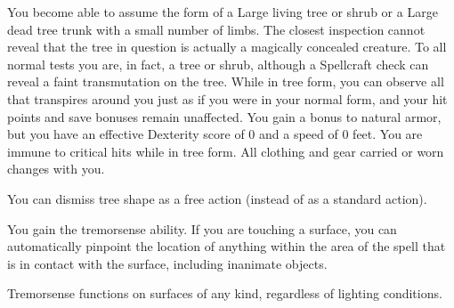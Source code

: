 \begin{spelleffect}
  You become able to assume the form of a Large living tree or shrub or a Large dead tree trunk with a small number of limbs. The closest inspection cannot reveal that the tree in question is actually a magically concealed creature. To all normal tests you are, in fact, a tree or shrub, although a Spellcraft check can reveal a faint transmutation on the tree. While in tree form, you can observe all that transpires around you just as if you were in your normal form, and your hit points and save bonuses remain unaffected. You gain a  bonus to natural armor, but you have an effective Dexterity score of 0 and a speed of 0 feet. You are immune to critical hits while in tree form. All clothing and gear carried or worn changes with you.
\end{spelleffect}
\begin{spellnotes}
  You can dismiss tree shape as a free action (instead of as a standard action).
\end{spellnotes}

\begin{spelleffect}
  You gain the tremorsense ability. If you are touching a surface, you can automatically pinpoint the location of anything within the area of the spell that is in contact with the surface, including inanimate objects.
\end{spelleffect}
\begin{spellnotes}
  Tremorsense functions on surfaces of any kind, regardless of lighting conditions.
\end{spellnotes}

